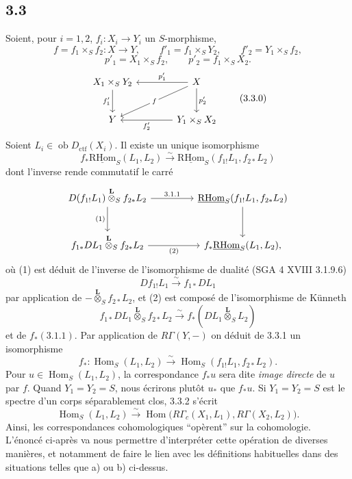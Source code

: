 \documentclass[11pt]{article}
\DeclareMathOperator{\Hom}{Hom}
\newcommand{\ob}{\operatorname{ob}}
\providecommand{\RHom}{\mathrm{RHom}}
\providecommand{\uRHom}{\underline{\RHom}}
\providecommand{\Dctf}{D_{\mathrm{ctf}}}
\providecommand{\Dctf}{D_{\mathrm{ctf}}}
\providecommand{\RHom}{\mathrm{RHom}}
\providecommand{\Hom}{\operatorname{Hom}}
\providecommand{\ob}{\operatorname{ob}}
\providecommand{\RHom}{\mathrm R\mathcal{H}om}
\providecommand{\RHom}{\mathrm{RHom}}
\providecommand{\Hom}{\operatorname{Hom}}
\begin{document}
\subsection*{3.3}
Soient, pour $i=1,2$, $f_i:X_i\to Y_i$ un $S$-morphisme,
\[
f=f_1\times_S f_2:X\to Y,
\qquad
f'_1=f_1\times_S Y_2,
\qquad
f'_2=Y_1\times_S f_2,
\]
\[
p'_1=X_1\times_S f_2,
\qquad
p'_2=f_1\times_S X_2.
\]
\begin{equation}
\begin{tikzcd}[column sep=3.8em,row sep=2.4em]
X_1\times_S Y_2 \arrow[d,"f'_1"'] & X \arrow[l,"p'_1"'] \arrow[dl,"f" description] \arrow[d,"p'_2"] \\
Y & Y_1\times_S X_2 \arrow[l,"f'_2"]
\end{tikzcd}
\tag{3.3.0}
\end{equation}
Soient $L_i\in\ob\Dctf(X_i)$. Il existe un unique isomorphisme
\begin{equation}
f_*\uRHom_S(L_1,L_2)
\xrightarrow{\sim}
\uRHom_S(f_{1!}L_1,f_{2*}L_2)
\tag{3.3.1}
\end{equation}
dont l'inverse rende commutatif le carré
\[
\begin{tikzcd}[column sep=4.5em,row sep=2.6em]
D(f_{1!}L_1)\overset{\mathbf L}{\otimes}_S f_{2*}L_2
  \arrow[r,"3.1.1"] \arrow[d,"(1)"']
& \uRHom_S(f_{1!}L_1,f_{2*}L_2) \arrow[d] \\
f_{1*}DL_1\overset{\mathbf L}{\otimes}_S f_{2*}L_2
  \arrow[r,"(2)"']
& f_*\uRHom_S(L_1,L_2),
\end{tikzcd}
\]
où (1) est déduit de l'inverse de l'isomorphisme de dualité (SGA 4 XVIII 3.1.9.6)
\[
Df_{1!}L_1\xrightarrow{\sim}f_{1*}DL_1
\]
par application de $-\overset{\mathbf L}{\otimes}_S f_{2*}L_2$, et (2) est composé de l'isomorphisme de Künneth
\[
f_{1*}DL_1\overset{\mathbf L}{\otimes}_S f_{2*}L_2
\xrightarrow{\sim}
f_*(DL_1\overset{\mathbf L}{\otimes}_S L_2)
\]
et de $f_*(3.1.1)$. Par application de $R\Gamma(Y,-)$ on déduit de 3.3.1 un isomorphisme
\begin{equation}
f_*:\Hom_S(L_1,L_2)
\xrightarrow{\sim}
\Hom_S(f_{1!}L_1,f_{2*}L_2).
\tag{3.3.2}
\end{equation}
Pour $u\in\Hom_S(L_1,L_2)$, la correspondance $f_*u$ sera dite \emph{image directe} de $u$ par $f$. Quand $Y_1=Y_2=S$, nous écrirons plutôt $u_*$ que $f_*u$. Si $Y_1=Y_2=S$ est le spectre d'un corps séparablement clos, 3.3.2 s'écrit
\begin{equation}
\Hom_S(L_1,L_2)
\xrightarrow{\sim}
\Hom\bigl(R\Gamma_c(X_1,L_1),R\Gamma(X_2,L_2)\bigr).
\tag{3.3.3}
\end{equation}
Ainsi, les correspondances cohomologiques ``opèrent'' sur la cohomologie. L'énoncé ci-après va nous permettre d'interpréter cette opération de diverses manières, et notamment de faire le lien avec les définitions habituelles dans des situations telles que a) ou b) ci-dessus.
\end{document}
